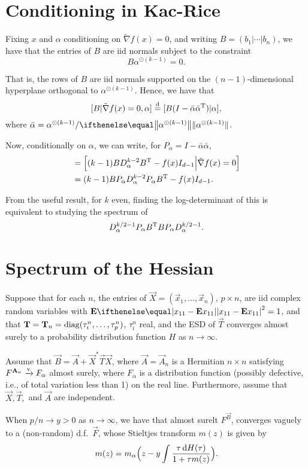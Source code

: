 \documentclass{hw-scrartcl}
\begin{document}
\section{Conditioning in Kac-Rice}
Fixing \(x\) and \(\alpha\) conditioning on \(\tilde{\nabla} f(x) = 0\), and writing \(B = (b_1\vert \dotsb \vert b_n)\), we have that the entries of \(B\) are iid normals subject to the constraint
\[
  B\alpha^{\odot (k-1)} = 0.
\]

That is, the rows of \(B\) are iid normals supported on the \((n-1)\)-dimensional hyperplane orthogonal to \(\alpha^{\odot (k-1)}\). Hence, we have that
\[
  [B | \tilde{\nabla} f(x) = 0, \alpha]
  \stackrel{\mathrm{d}}{=} [B(I - \bar{\alpha}\bar{\alpha}^{\mathrm{T}}) | \alpha],
\]
where \(\bar{\alpha} = \alpha^{\odot (k-1)}/\norm{\alpha^{\odot (k-1)}}\).

Now, conditionally on \(\alpha\), we can write, for \(P_\alpha = I - \bar{\alpha}\bar{\alpha}\),
\begin{align*}
  [\tilde{\nabla}^2 f(x) |  \tilde{\nabla} f(x) = 0]
  &= \Big[(k-1) B D_\alpha^{k-2}B\transp - f(x) \Id_{d-1} \Big| \tilde{\nabla} f(x) = 0\Big] \\
  &= (k-1) B P_\alpha D_\alpha^{k-2} P_\alpha B\transp - f(x) \Id_{d-1}.
\end{align*}

From the useful result, for \(k\) even, finding the log-determinant of this is equivalent to studying the spectrum of
\[
  D_\alpha^{k/2 -1} P_\alpha B^{\mathrm{T}} B P_\alpha D_\alpha^{k/2 - 1}.
\]

\section{Spectrum of the Hessian}

\begin{theorem}
  Suppose that for each \(n\), the entries of \(\vec{X} = (\vec{x}_1, \dotsc, \vec{x}_n)\), \(p\times n\), are iid complex random variables with \(\E\abs{x_{11} - \E x_{11}}^2 = 1\), and that \(\mathbf{T} = \mathbf{T}_n = \operatorname{diag}(\tau_i^n, \dotsc, \tau_p^n)\), \(\tau_i^n\) real, and the ESD of \(\vec{T}\) converges almost surely to a probability distribution function \(H\) as \(n\rightarrow \infty\).

  Assume that \(\vec{B} = \vec{A} + \vec{X}^* \vec{T} \vec{X}\), where \(\vec{A} = \vec{A}_n\) is a Hermitian \(n\times n\) satisfying \(F^{\mathbf{A}_n} \xrightarrow{\mathrm{v}} F_\alpha\) almost surely, where \(F_\alpha\) is a distribution function (possibly defective, i.e., of total variation less than 1) on the real line. Furthermore, assume that \(\vec{X}, \vec{T},\) and \(\vec{A}\) are independent.

  When \(p/n \rightarrow y > 0\) as \(n\rightarrow \infty\), we have that almost surelt \(F^{\vec{B}}\), converges vaguely to a (non-random) d.f.\ \(\vec{F}\), whose Stieltjes transform \(m(z)\) is given by
  \begin{equation}
    \label{eqn:SilBai-stiltjes}
    m(z)
    = m_\alpha\Big(z - y\int \frac{\tau\mathop{}\!\mathrm{d} H(\tau)}{1 + \tau m(z)}\Big).
  \end{equation}
\end{theorem}
\end{document}
